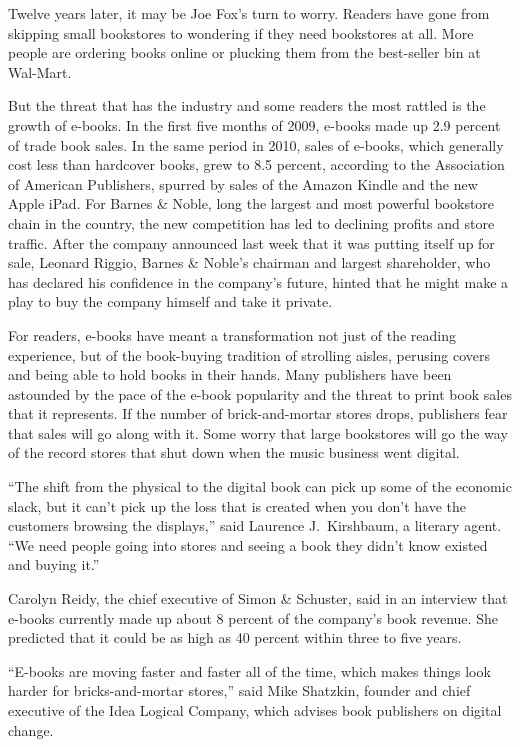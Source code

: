 ﻿\documentclass[12pt]{article}
\begin{document}
Twelve years later, it may be Joe Fox's turn to worry. Readers have gone from skipping small
bookstores to wondering if they need bookstores at all. More people are ordering books online or
plucking them from the best-seller bin at Wal-Mart.

But the threat that has the industry and some readers the most rattled is the growth of e-books. In
the first five months of 2009, e-books made up 2.9 percent of trade book sales. In the same period
in 2010, sales of e-books, which generally cost less than hardcover books, grew to 8.5 percent,
according to the Association of American Publishers, spurred by sales of the Amazon Kindle and the
new Apple iPad. For Barnes \& Noble, long the largest and most powerful bookstore chain in the
country, the new competition has led to declining profits and store traffic. After the company
announced last week that it was putting itself up for sale, Leonard Riggio, Barnes \& Noble's
chairman and largest shareholder, who has declared his confidence in the company's future, hinted
that he might make a play to buy the company himself and take it private.

For readers, e-books have meant a transformation not just of the reading experience, but of the
book-buying tradition of strolling aisles, perusing covers and being able to hold books in their
hands. Many publishers have been astounded by the pace of the e-book popularity and the threat to
print book sales that it represents. If the number of brick-and-mortar stores drops, publishers fear
that sales will go along with it. Some worry that large bookstores will go the way of the record
stores that shut down when the music business went digital.

``The shift from the physical to the digital book can pick up some of the economic slack, but it
can't pick up the loss that is created when you don't have the customers browsing the displays,''
said Laurence J.~Kirshbaum, a literary agent. ``We need people going into stores and seeing a book
they didn't know existed and buying it.''

Carolyn Reidy, the chief executive of Simon \& Schuster, said in an interview that e-books currently
made up about 8 percent of the company's book revenue. She predicted that it could be as high as 40
percent within three to five years.

``E-books are moving faster and faster all of the time, which makes things look harder for
bricks-and-mortar stores,'' said Mike Shatzkin, founder and chief executive of the Idea Logical
Company, which advises book publishers on digital change.
\end{document}
